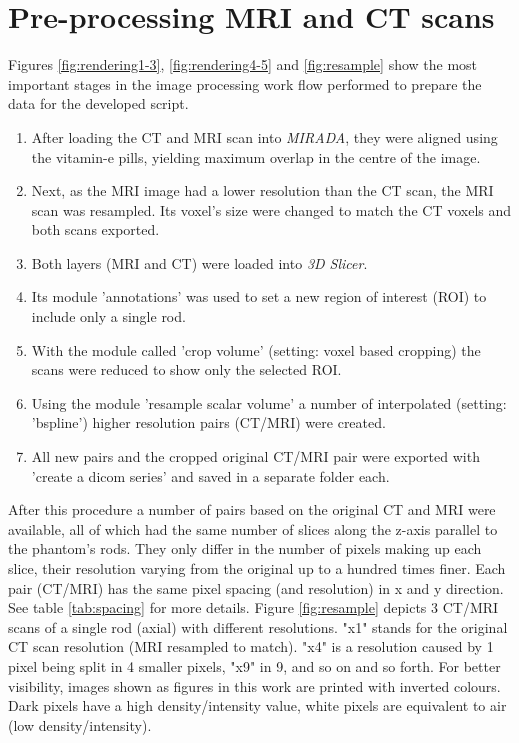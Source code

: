 \section{Pre-processing MRI and CT scans}
\label{sec:prep}

Figures \ref{fig:rendering1-3}, \ref{fig:rendering4-5} and \ref{fig:resample} show the most important stages in the image processing work flow performed to prepare the data for the developed script.

\begin{enumerate}[label=\textbf{Step \arabic*}]
\item After loading the CT and MRI scan into \textit{MIRADA}, they were aligned using the vitamin-e pills, yielding maximum overlap in the centre of the image.
\item Next, as the MRI image had a lower resolution than the CT scan, the MRI scan was resampled.
Its voxel's size were changed to match the CT voxels and both scans exported.
\item Both layers (MRI and CT) were loaded into \textit{3D Slicer}.
\item Its module 'annotations' was used to set a new region of interest (ROI) to include only a single rod.
\item With the module called 'crop volume' (setting: voxel based cropping) the scans were reduced to show only the selected ROI.
\item Using the module 'resample scalar volume' a number of interpolated (setting: 'bspline') higher resolution pairs (CT/MRI) were created.
\item All new pairs and the cropped original CT/MRI pair were exported with 'create a dicom series' and saved in a separate folder each.
\end{enumerate}
\vspace*{0.5cm}

After this procedure a number of pairs based on the original CT and MRI were available, all of which had the same number of slices along the z-axis parallel to the phantom's rods.
They only differ in the number of pixels making up each slice, their resolution varying from the original up to a hundred times finer.
Each pair (CT/MRI) has the same pixel spacing (and resolution) in x and y direction.
See table \ref{tab:spacing} for more details.
Figure \ref{fig:resample} depicts 3 CT/MRI scans of a single rod (axial) with different resolutions.
"x1" stands for the original CT scan resolution (MRI resampled to match).
"x4" is a resolution caused by 1 pixel being split in 4 smaller pixels, "x9" in 9, and so on and so forth.
For better visibility, images shown as figures in this work are printed with inverted colours.
Dark pixels have a high density/intensity value, white pixels are equivalent to air (low density/intensity).

